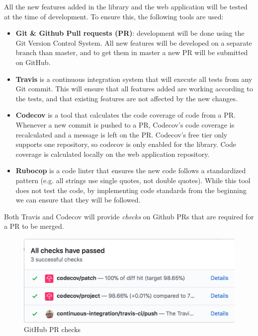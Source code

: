 All the new features added in the library and the web application will be tested at the time of development. To ensure this, the following tools are used:
\begin{itemize}
  \item \textbf{Git \& Github Pull requests (PR)}: development will be done using the Git Version Control System. All new features will be developed on a separate branch than master, and to get them in master a new PR will be submitted on GitHub.
  \item \textbf{Travis} is a continuous integration system that will execute all tests from any Git commit. This will ensure that all features added are working according to the tests, and that existing features are not affected by the new changes.
  \item \textbf{Codecov} is a tool that calculates the code coverage of code from a PR. Whenever a new commit is pushed to a PR, Codecov's code coverage is recalculated and a message is left on the PR. Codecov's free tier only supports one repository, so codecov is only enabled for the library. Code coverage is calculated locally on the web application repository.
  \item \textbf{Rubocop} is a code linter that ensures the new code follows a standardized pattern (e.g. all strings use single quotes, not double quotes). While this tool does not test the code, by implementing code standards from the beginning we can ensure that they will be followed.
\end{itemize}

Both Travis and Codecov will provide \textit{checks} on Github PRs that are required for a PR to be merged.

\begin{figure}[htp]
    \centering
    \includegraphics[width=(\linewidth / 3 * 2)]{Chapters/3-RequirementAndSpecifications/github_checks.png}
    \caption{GitHub PR checks}
    \label{fig:github_pr}
\end{figure}

